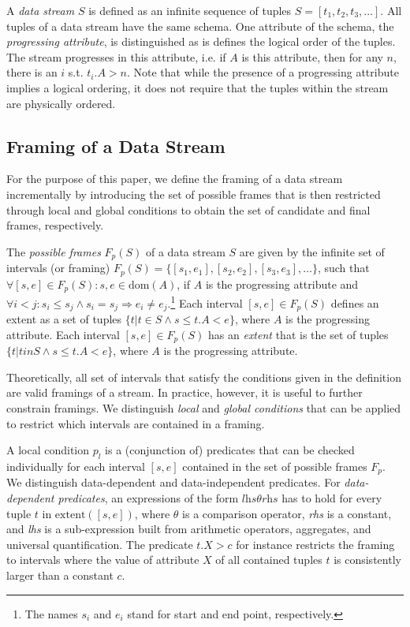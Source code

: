 \documentclass{vldb}
\begin{document}
\begin{definition}
A \emph{data stream} $S$ is defined as an infinite sequence of tuples $S=[t_1, t_2, t_3, \ldots]$. All tuples of a data stream have the same schema. One attribute of the schema, the \emph{progressing attribute}, is distinguished as is defines the logical order of the tuples. The stream progresses in this attribute, i.e. if $A$ is this attribute, then for any $n$, there is an $i$ s.t. $t_i.A > n$. Note that while the presence of a progressing attribute implies a logical ordering, it does not require that the tuples within the stream are physically ordered.
\end{definition}

\subsection{Framing of a Data Stream}

For the purpose of this paper, we define the framing of a data stream incrementally by introducing the set of possible frames that is then restricted through local and global conditions to obtain the set of candidate and final frames, respectively.

\begin{definition}
The \emph{possible frames} $F_p(S)$ of a data stream $S$ are given by the infinite set of intervals (or framing) $F_p(S) = \{[s_1,e_1],[s_2,e_2],[s_3,e_3],\ldots\}$, such that $\forall [s,e] \in F_p(S): s,e \in \text{dom}(A)$, if $A$ is the progressing attribute and $\forall i < j: s_i \leq s_j \wedge s_i = s_j \Rightarrow e_i \neq e_j$.\footnote{The names $s_i$ and $e_i$ stand for start and end point, respectively.} Each interval $[s,e] \in F_p(S)$ defines an extent as a set of tuples $\{t | t \in S \wedge s \leq t.A < e \}$, where $A$ is the progressing attribute. Each interval $[s,e] \in F_p(S)$ has an \emph{extent} that is the set of tuples $\{t|t in S \wedge s \leq t.A < e\}$, where $A$ is the progressing attribute.
\end{definition}

Theoretically, all set of intervals that satisfy the conditions given in the definition are valid framings of a stream. In practice, however, it is useful to further constrain framings. We distinguish \emph{local} and \emph{global conditions} that can be applied to restrict which intervals are contained in a framing.

A local condition $p_l$ is a (conjunction of) predicates that can be checked individually  for each interval $[s,e]$ contained in the set of possible frames $F_p$. We distinguish data-de\-pen\-dent and data-independent predicates. For \emph{data-dependent predicates}, an expressions of the form $\textit{lhs} \theta \textit{rhs}$ has to hold for every tuple $t$ in $\text{extent}([s,e])$, where $\theta$ is a comparison operator, \textit{rhs} is a constant, and \textit{lhs} is a sub-expression built from arithmetic operators, aggregates, and universal quantification. The predicate $t.X > c$ for instance restricts the framing to intervals where the value of attribute $X$ of all contained tuples $t$ is consistently larger than a constant $c$. 
\end{document}
